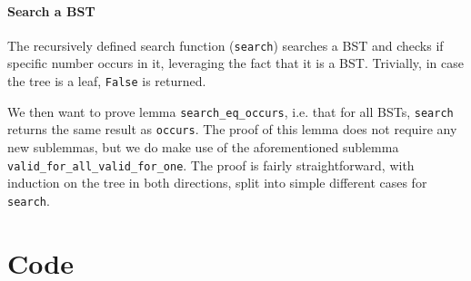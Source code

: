 \documentclass[a4paper]{article}
\begin{document}


\paragraph{Search a BST}

The recursively defined search function (\texttt{search}) searches a BST and checks if specific number occurs in it, leveraging the fact that it is a BST. Trivially, in case the tree is a leaf, \texttt{False} is returned.



We then want to prove lemma \texttt{search\_eq\_occurs}, i.e. that for all BSTs, \texttt{search} returns the same result as \texttt{occurs}. The proof of this lemma does not require any new sublemmas, but we do make use of the aforementioned sublemma \texttt{valid\_for\_all\_valid\_for\_one}. The proof is fairly straightforward, with induction on the tree in both directions, split into simple different cases for \texttt{search}.



\newpage
\appendix

\section{Code}


\end{document}
